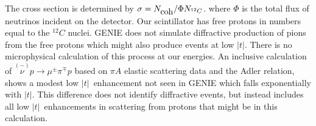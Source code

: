 \documentclass[aps,prl,twocolumn,showpacs,superscriptaddress,nofootinbib]{revtex4}
\newcommand{\tcoh}{\ensuremath{\left| t\right| \xspace}}
\newcommand{\rmt}{\rm\textstyle}
\begin{document}
The cross section is
determined by $\sigma = N_{\rmt coh}/\Phi N_{^{12}C}$.
where $\Phi$ is the total flux of neutrinos incident on the detector.
Our scintillator has free protons in numbers equal to the $^{12}C$
nuclei.  GENIE does not simulate diffractive production of pions from
the free protons which might also produce events at low \tcoh. There
is no microphysical calculation of this process at our energies.  An
inclusive calculation of $\stackrel{(-)}{\nu}p\to\mu^\pm\pi^\mp p$
based on $\pi A$ elastic scattering data and the Adler
relation\cite{Adler:1964yx,Kopeliovich:private}, shows a modest
low \tcoh\ enhancement not seen in GENIE which falls exponentially with \tcoh.  This difference does not identify diffractive
events, but instead includes all low \tcoh\ enhancements in scattering
from protons that might be in this calculation.  
\end{document}
